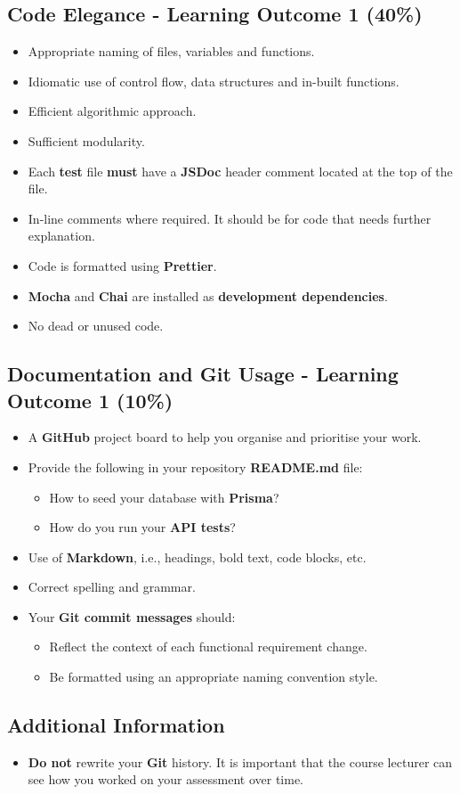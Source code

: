 \documentclass{article}
\begin{document}
\subsection*{Code Elegance - Learning Outcome 1 (40\%)}
\begin{itemize}
  \item Appropriate naming of files, variables and functions.
	\item Idiomatic use of control flow, data structures and in-built functions.
  \item Efficient algorithmic approach.
  \item Sufficient modularity.
	\item Each \textbf{test} file \textbf{must} have a \textbf{JSDoc} header comment located at the top of the file.
  \item In-line comments where required. It should be for code that needs further explanation.
	\item Code is formatted using \textbf{Prettier}.
	\item \textbf{Mocha} and \textbf{Chai} are installed as \textbf{development dependencies}.	
  \item No dead or unused code.
\end{itemize}

\subsection*{Documentation and Git Usage - Learning Outcome 1 (10\%)}
\begin{itemize}
  \item A \textbf{GitHub} project board to help you organise and prioritise your work. 
    \item Provide the following in your repository \textbf{README.md} file:
    \begin{itemize} 
      \item How to seed your database with \textbf{Prisma}?
      \item How do you run your \textbf{API tests}?
    \end{itemize}
    \item Use of \textbf{Markdown}, i.e., headings, bold text, code blocks, etc.
    \item Correct spelling and grammar.
    \item Your \textbf{Git commit messages} should:
    \begin{itemize}
      \item Reflect the context of each functional requirement change.
      \item Be formatted using an appropriate naming convention style.
    \end{itemize}	
\end{itemize}
          
\subsection*{Additional Information}
\begin{itemize}
    \item \textbf{Do not} rewrite your \textbf{Git} history. It is important that the course lecturer can see how you worked on your assessment over time. 
\end{itemize} 
\end{document}
